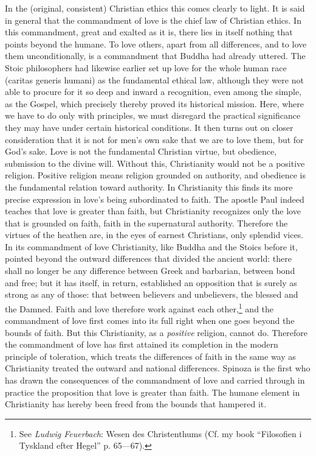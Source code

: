 \documentclass[12pt,a4paper,openany]{book}
\newcommand{\opage}[1]{\marginnote{\footnotesize\textit{[#1]}}}
\begin{document}
In the (original, consistent) Christian ethics this comes clearly to light. It
is said in general that the commandment of love is the chief law of Christian
ethics. In this commandment, great and exalted as it is, there lies in itself
nothing that points beyond the humane. To love others, apart from all
differences, and to love them unconditionally, is a commandment that Buddha
had already uttered. The Stoic philosophers had likewise earlier set up love
\opage{70}for the whole human race (caritas generis humani) as the fundamental
ethical law, although they were not able to procure for it so deep and inward
a recognition, even among the simple, as the Gospel, which precisely thereby
proved its historical mission. Here, where we have to do only with principles,
we must disregard the practical significance they may have under certain
historical conditions. It then turns out on closer consideration that it is
not for men's own sake that we are to love them, but for God's sake. Love is
not the fundamental Christian virtue, but obedience, submission to the divine
will. Without this, Christianity would not be a positive religion. Positive
religion means religion grounded on authority, and obedience is the
fundamental relation toward authority. In Christianity this finds its more
precise expression in love's being subordinated to faith. The apostle Paul
indeed teaches that love is greater than faith, but Christianity recognizes
only the love that is grounded on faith, faith in the supernatural authority.
Therefore the virtues of the heathen are, in the eyes of earnest Christians,
only splendid vices. In its commandment of love Christianity, like Buddha and
the Stoics before it, pointed beyond the outward differences that divided the
ancient world: there shall no longer be any difference between Greek and
barbarian, between bond and free; but it has itself, in return, established an
opposition that is surely as strong as any of those: that between believers
and unbelievers, the blessed and the
\opage{71}Damned. Faith and love therefore work against each
other,\footnote[1]{See \emph{Ludwig Feuerbach}: Wesen des Christenthums (Cf.
my book ``Filosofien i Tyskland efter Hegel'' p. 65---67).} and the
commandment of love first comes into its full right when one goes beyond the
bounds of faith. But this Christianity, as a \emph{positive} religion, cannot
do. Therefore the commandment of love has first attained its completion in the
modern principle of toleration, which treats the differences of faith in the
same way as Christianity treated the outward and national differences. Spinoza
is the first who has drawn the consequences of the commandment of love and
carried through in practice the proposition that love is greater than faith.
The humane element in Christianity has hereby been freed from the bounds that
hampered it.
\end{document}
